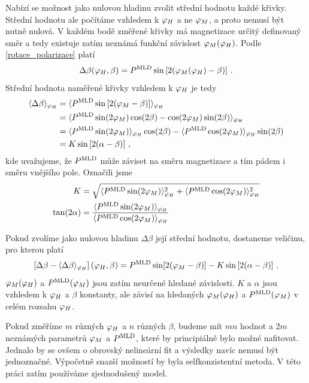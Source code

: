 Nabízí se možnost jako nulovou hladinu zvolit střední hodnotu každé křivky. Střední hodnotu ale počítáme vzhledem k $\varphi_H$ a ne $\varphi_M$, a proto nemusí být nutně nulová.
V každém bodě změřené křivky má magnetizace určitý definovaný směr a tedy existuje zatím neznámá funkční závislost $\varphi_M(\varphi_H)$. Podle \eqref{rotace_polarizace} platí
\begin{equation}
\Delta \beta(\varphi_H, \beta) = P^{\text{MLD}} \sin \left[ 2(\varphi_M(\varphi_H)-\beta) \right] \,.
\end{equation}
Střední hodnota naměřené křivky vzhledem k $\varphi_H$ je tedy
\begin{equation}
\begin{aligned}
\langle \Delta\beta \rangle_{\varphi_H} &= \langle P^{\text{MLD}} \sin \left[ 2(\varphi_M-\beta) \right] \rangle_{\varphi_H} \\
&= \langle P^{\text{MLD}} \sin(2\varphi_M)\cos(2\beta)-\cos(2\varphi_M)\sin(2\beta) \rangle_{\varphi_H} \\
&=  \langle P^{\text{MLD}}\sin(2\varphi_M) \rangle_{\varphi_H}\cos(2\beta)- \langle P^{\text{MLD}}\cos(2\varphi_M) \rangle_{\varphi_H}\sin(2\beta) \\
&=K \sin\left[ 2(\alpha-\beta) \right] \,, \\
\end{aligned}
\end{equation}
kde uvažujeme, že $P^{\text{MLD}}$ může záviset na směru magnetizace a tím pádem i směru vnějšího pole. Označili jsme
\begin{equation}
\begin{aligned}
K&=\sqrt{ \langle P^{\text{MLD}}\sin(2\varphi_M)  \rangle_{\varphi_H}^2 +  \langle P^{\text{MLD}}\cos(2\varphi_M)  \rangle_{\varphi_H}^2 } \\
\tan(2\alpha) &=\frac{\langle P^{\text{MLD}}\sin(2\varphi_M)  \rangle_{\varphi_H}}{\langle P^{\text{MLD}}\cos(2\varphi_M)  \rangle_{\varphi_H}}
\end{aligned}
\end{equation}

Pokud zvolíme jako nulovou hladinu $\Delta\beta$ její střední hodnotu, dostaneme veličinu, pro kterou platí
\begin{equation}
\left[ \Delta \beta - \langle \Delta\beta \rangle_{\varphi_H}  \right](\varphi_H, \beta)=P^{\text{MLD}} \sin[2(\varphi_M-\beta)] - K \sin\left[ 2(\alpha-\beta) \right] \,.
\end{equation}
$\varphi_M(\varphi_H)$ a $P^{\text{MLD}}(\varphi_M)$ jsou zatím neurčené hledané závislosti. $K$ a $\alpha$ jsou vzhledem k $\varphi_H$ a $\beta$ konstanty, ale závisí na hledaných $\varphi_M(\varphi_H)$ a $P^{\text{MLD}}(\varphi_M)$ v celém rozsahu $\varphi_H$.

Pokud změříme $m$ různých $\varphi_H$ a $n$ různých $\beta$, budeme mít $mn$ hodnot a $2m$ neznámých parametrů $\varphi_M$ a $P^{\text{MLD}}$, které by principiálně bylo možné nafitovat. Jednalo by se ovšem o obrovský nelineární fit a výsledky navíc nemusí být jednoznačné.
Výpočetně snazší možností by byla selfkonzistentní metoda. V této práci zatím používáme zjednodušený model.

